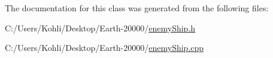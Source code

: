 The documentation for this class was generated from the following files:\begin{DoxyCompactItemize}
\item 
C:/Users/Kohli/Desktop/Earth-\/20000/\hyperlink{enemy_ship_8h}{enemyShip.h}\item 
C:/Users/Kohli/Desktop/Earth-\/20000/\hyperlink{enemy_ship_8cpp}{enemyShip.cpp}\end{DoxyCompactItemize}
